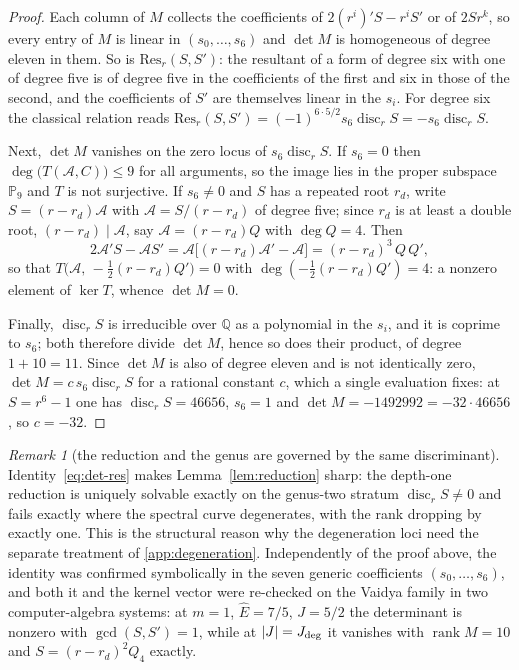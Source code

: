 \documentclass[12pt]{iopart}
\newcommand{\Ehat}{\hat E}
\newcommand{\Jc}{J_{\rm deg}}
\theoremstyle{plain}
\theoremstyle{definition}
\theoremstyle{plain}
\theoremstyle{remark}
\newtheorem*{remark}{Remark}
\begin{document}
\begin{proof}
Each column of $M$ collects the coefficients of $2(r^i)'S-r^iS'$ or of $2Sr^k$, so every
entry of $M$ is linear in $(s_0,\dots,s_6)$ and $\det M$ is homogeneous of degree eleven in
them. So is $\mathrm{Res}_r(S,S')$: the resultant of a form of degree six with one of
degree five is of degree five in the coefficients of the first and six in those of the
second, and the coefficients of $S'$ are themselves linear in the $s_i$. For degree six the
classical relation reads $\mathrm{Res}_r(S,S')=(-1)^{6\cdot5/2}s_6\operatorname{disc}_rS
=-s_6\operatorname{disc}_rS$.

Next, $\det M$ vanishes on the zero locus of $s_6\operatorname{disc}_rS$. If $s_6=0$ then
$\deg\big(T(\mathcal{A},C)\big)\le9$ for all arguments, so the image lies in the proper
subspace $\mathbb{P}_9$ and $T$ is not surjective. If $s_6\neq0$ and $S$ has a repeated
root $r_d$, write $S=(r-r_d)\mathcal{A}$ with $\mathcal{A}=S/(r-r_d)$ of degree five; since
$r_d$ is at least a double root, $(r-r_d)\mid\mathcal{A}$, say $\mathcal{A}=(r-r_d)Q$ with
$\deg Q=4$. Then
\[
   2\mathcal{A}'S-\mathcal{A}S'
   =\mathcal{A}\big[(r-r_d)\mathcal{A}'-\mathcal{A}\big]
   =(r-r_d)^3\,Q\,Q' ,
\]
so that $T\big(\mathcal{A},\,-\tfrac12(r-r_d)Q'\big)=0$ with $\deg(-\tfrac12(r-r_d)Q')=4$:
a nonzero element of $\ker T$, whence $\det M=0$.

Finally, $\operatorname{disc}_rS$ is irreducible over $\mathbb{Q}$ as a polynomial in the
$s_i$, and it is coprime to $s_6$; both therefore divide $\det M$, hence so does their
product, of degree $1+10=11$. Since $\det M$ is also of degree eleven and is not
identically zero, $\det M=c\,s_6\operatorname{disc}_rS$ for a rational constant $c$, which
a single evaluation fixes: at $S=r^6-1$ one has $\operatorname{disc}_rS=46656$, $s_6=1$
and $\det M=-1492992=-32\cdot46656$, so $c=-32$.
\end{proof}

\begin{remark}[the reduction and the genus are governed by the same discriminant]
Identity~\eqref{eq:det-res} makes Lemma~\ref{lem:reduction} sharp: the depth-one
reduction is uniquely solvable exactly on the genus-two stratum
$\operatorname{disc}_rS\neq0$ and fails exactly where the spectral curve degenerates,
with the rank dropping by exactly one. This is the structural reason why the degeneration
loci need the separate treatment of \ref{app:degeneration}. Independently of the proof
above, the identity was confirmed symbolically in the seven generic coefficients
$(s_0,\dots,s_6)$, and both it and the kernel vector were re-checked on the Vaidya family
in two computer-algebra systems: at $m=1$, $\Ehat=7/5$, $J=5/2$ the determinant is nonzero
with $\gcd(S,S')=1$, while at $|J|=\Jc$ it vanishes with $\operatorname{rank}M=10$ and
$S=(r-r_d)^2Q_4$ exactly.
\end{remark}
\end{document}

